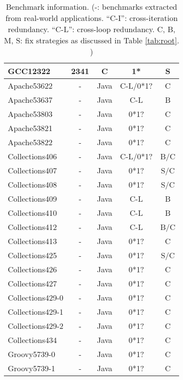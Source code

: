 \begin{table}
\begin{tabular}{lcccc}
   GCC12322              & 2341            & C                      &  1*          & S\\
   \midrule
   \midrule
Apache53622	  	 &  -		   &Java		    &C-L/0*1?	   &C\\
Apache53637		 &  -		   &Java		    &C-L	   &B\\
Apache53803		 &  -		   &Java		    &0*1?	   &C\\
Apache53821	         &  -		   &Java		    &0*1?	   &C\\
Apache53822	         &  -		   &Java		    &0*1?	   &C\\		
\midrule
Collections406&  -		   &Java		    &C-L/0*1?	   &B/C\\
Collections407&  -		   &Java		    &0*1?	   &S/C\\
Collections408&  -		   &Java		    &0*1?	   &S/C\\
Collections409&  -		   &Java		    &C-L	   &B\\
Collections410&  -		   &Java		    &C-L	   &B\\
Collections412&  -		   &Java		    &C-L	   &B/C\\
Collections413&  -		   &Java		    &0*1?	   &C\\
Collections425&  -		   &Java		    &0*1?	   &S/C\\
Collections426&  -		   &Java		    &0*1?	   &C\\
Collections427&  -		   &Java		    &0*1?	   &C\\
Collections429-0&  -		   &Java		    &0*1?	   &C\\
Collections429-1&  -		   &Java		    &0*1?	   &C\\
Collections429-2&  -		   &Java		    &0*1?	   &C\\
Collections434&  -		   &Java		    &0*1?	   &C\\
\midrule
Groovy5739-0&  -		   &Java		    &0*1?	   &C\\
Groovy5739-1&  -		   &Java		    &0*1?	   &C\\
\bottomrule
   \end{tabular}
  \caption{Benchmark information.
  (-: benchmarks extracted from real-world applications.
  ``C-I'': cross-iteration redundancy.
  ``C-L'': cross-loop redundancy.
  C, B, M, S: fix strategies as discussed in
  Table \ref{tab:root}.
  ) 
 }
  \label{tab:benchmarks}
\end{table}


